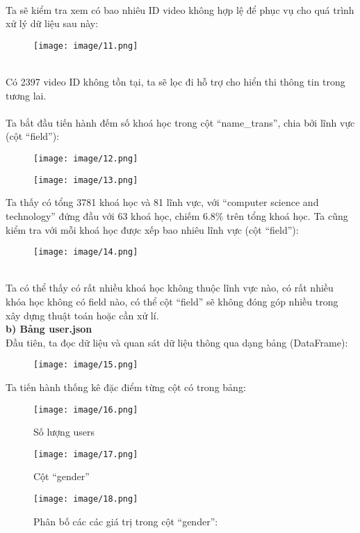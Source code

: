 \\
Ta sẽ kiểm tra xem có bao nhiêu ID video không hợp lệ để phục vụ cho quá trình xử lý dữ liệu sau này:
\begin{figure}[h]
    \centering
    \texttt{[image: image/11.png]}
\end{figure}\\
Có 2397 video ID không tồn tại, ta sẽ lọc đi hỗ trợ cho hiển thi thông tin trong tương lai.\\
\\
Ta bắt đầu tiến hành đếm số khoá học trong cột “name\_trans”, chia bởi lĩnh vực (cột “field”):\\
\begin{figure}[h]
    \centering
    \texttt{[image: image/12.png]}
\end{figure}
\newpage
\begin{figure}
    \centering
    \texttt{[image: image/13.png]}
\end{figure}
Ta thấy có tổng 3781 khoá học và 81 lĩnh vực, với “computer science and technology” đứng đầu với 63 khoá học, chiếm 6.8\% trên tổng khoá học. Ta cũng kiểm tra với mỗi khoá học được xếp bao nhiêu lĩnh vực (cột “field”):
\begin{figure}[h]
    \centering
    \texttt{[image: image/14.png]}
\end{figure}\\
\newpage
Ta có thể thấy có rất nhiều khoá học không thuộc lĩnh vực nào, có rất nhiều khóa học không có field nào, có thể cột “field” sẽ không đóng góp nhiều trong xây dựng thuật toán hoặc cần xử lí.\\
\textbf{b) Bảng user.json}\\
Đầu tiên, ta đọc dữ liệu và quan sát dữ liệu thông qua dạng bảng (DataFrame):
\begin{figure}[h]
    \centering
    \texttt{[image: image/15.png]}
\end{figure}
\newpage
Ta tiến hành thống kê đặc điểm từng cột có trong bảng:
\begin{figure}[h]
    \centering
    \texttt{[image: image/16.png]}
    \caption{Số lượng users}
\end{figure}
\begin{figure}[h]
    \centering
    \texttt{[image: image/17.png]}
    \caption{Cột “gender”}
\end{figure}
\begin{figure}[h]
    \centering
    \texttt{[image: image/18.png]}
    \caption{Phân bố các các giá trị trong cột “gender”:}
\end{figure}
